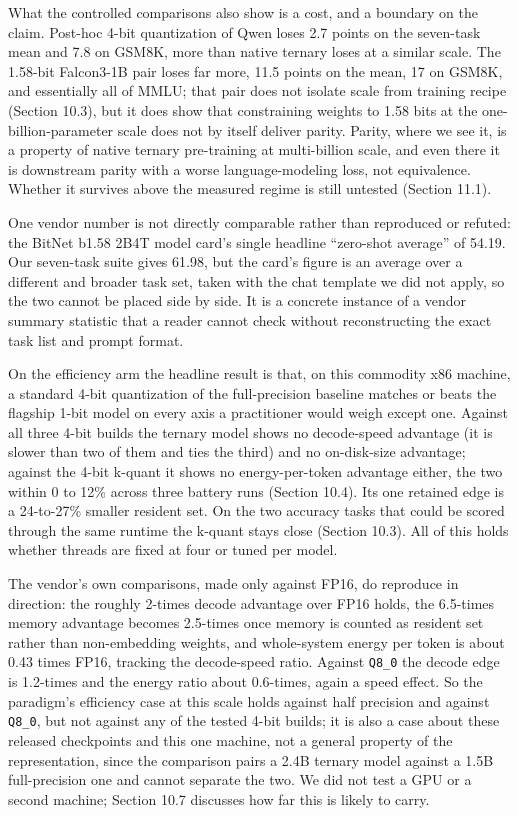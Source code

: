 \documentclass[11pt]{article}
\begin{document}
What the controlled comparisons also show is a cost, and a boundary on the claim. Post-hoc
4-bit quantization of Qwen loses 2.7 points on the seven-task mean and 7.8 on GSM8K, more
than native ternary loses at a similar scale. The 1.58-bit Falcon3-1B pair loses far more,
11.5 points on the mean, 17 on GSM8K, and essentially all of MMLU; that pair does not
isolate scale from training recipe (Section 10.3), but it does show that constraining
weights to 1.58 bits at the one-billion-parameter scale does not by itself deliver parity.
Parity, where we see it, is a property of native ternary pre-training at multi-billion
scale, and even there it is downstream parity with a worse language-modeling loss, not
equivalence. Whether it survives above the measured regime is still untested (Section 11.1).

One vendor number is not directly comparable rather than reproduced or refuted: the
BitNet b1.58 2B4T model card's single headline ``zero-shot average'' of 54.19. Our
seven-task suite gives 61.98, but the card's figure is an average over a different and
broader task set, taken with the chat template we did not apply, so the two cannot be
placed side by side. It is a concrete instance of a vendor summary statistic that a
reader cannot check without reconstructing the exact task list and prompt format.

On the efficiency arm the headline result is that, on this commodity x86 machine, a
standard 4-bit quantization of the full-precision baseline matches or beats the flagship
1-bit model on every axis a practitioner would weigh except one. Against all three 4-bit
builds the ternary model shows no decode-speed advantage (it is slower than two of them
and ties the third) and no on-disk-size advantage; against the 4-bit k-quant it shows no
energy-per-token advantage either, the two within 0 to 12\% across three battery runs
(Section 10.4). Its one retained edge is a 24-to-27\% smaller resident set. On the two
accuracy tasks that could be scored through the same runtime the k-quant stays close
(Section 10.3). All of this holds whether threads are fixed at four or tuned per model.

The vendor's own comparisons, made only against FP16, do reproduce in direction: the
roughly 2-times decode advantage over FP16 holds, the 6.5-times memory advantage becomes
2.5-times once memory is counted as resident set rather than non-embedding weights, and
whole-system energy per token is about 0.43 times FP16, tracking the decode-speed ratio.
Against \texttt{Q8\_0} the decode edge is 1.2-times and the energy ratio about 0.6-times, again a
speed effect. So the paradigm's efficiency case at this scale holds against half
precision and against \texttt{Q8\_0}, but not against any of the tested 4-bit builds; it is also a
case about these released checkpoints and this one machine, not a general property of
the representation, since the comparison pairs a 2.4B ternary model against a 1.5B
full-precision one and cannot separate the two. We did not test a GPU or a second
machine; Section 10.7 discusses how far this is likely to carry.
\end{document}

